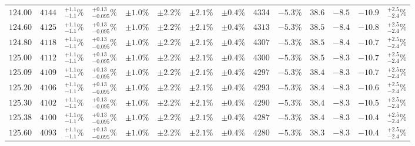\begin{landscape}
\begin{table}[ht!]
{\begin{tabular}{| cc | ccc | ccc | ccc | cc | c |}
$124.00$ & $4144$ & $^{+1.1}_{-1.1}\%$ & {\color{black!55}$^{+0.13}_{-0.095}\%$} & {\color{black!55}$\pm 1.0\%$} & $\pm 2.2\%$ & {\color{black!55}$\pm 2.1\%$} & {\color{black!55}$\pm 0.4\%$} & $4334$ & $-5.3\%$ & $38.6$ & $-8.5$ & $-10.9$ & $^{+2.5}_{-2.4}\%$ \\
$124.60$ & $4125$ & $^{+1.1}_{-1.1}\%$ & {\color{black!55}$^{+0.13}_{-0.095}\%$} & {\color{black!55}$\pm 1.0\%$} & $\pm 2.2\%$ & {\color{black!55}$\pm 2.1\%$} & {\color{black!55}$\pm 0.4\%$} & $4313$ & $-5.3\%$ & $38.5$ & $-8.4$ & $-10.8$ & $^{+2.5}_{-2.4}\%$ \\
$124.80$ & $4118$ & $^{+1.1}_{-1.1}\%$ & {\color{black!55}$^{+0.13}_{-0.095}\%$} & {\color{black!55}$\pm 1.0\%$} & $\pm 2.2\%$ & {\color{black!55}$\pm 2.1\%$} & {\color{black!55}$\pm 0.4\%$} & $4307$ & $-5.3\%$ & $38.5$ & $-8.4$ & $-10.7$ & $^{+2.5}_{-2.4}\%$ \\
$125.00$ & $4112$ & $^{+1.1}_{-1.1}\%$ & {\color{black!55}$^{+0.13}_{-0.095}\%$} & {\color{black!55}$\pm 1.0\%$} & $\pm 2.2\%$ & {\color{black!55}$\pm 2.1\%$} & {\color{black!55}$\pm 0.4\%$} & $4300$ & $-5.3\%$ & $38.5$ & $-8.3$ & $-10.7$ & $^{+2.5}_{-2.4}\%$ \\
$125.09$ & $4109$ & $^{+1.1}_{-1.1}\%$ & {\color{black!55}$^{+0.13}_{-0.095}\%$} & {\color{black!55}$\pm 1.0\%$} & $\pm 2.2\%$ & {\color{black!55}$\pm 2.1\%$} & {\color{black!55}$\pm 0.4\%$} & $4297$ & $-5.3\%$ & $38.4$ & $-8.3$ & $-10.7$ & $^{+2.5}_{-2.4}\%$ \\
$125.20$ & $4106$ & $^{+1.1}_{-1.1}\%$ & {\color{black!55}$^{+0.13}_{-0.095}\%$} & {\color{black!55}$\pm 1.0\%$} & $\pm 2.2\%$ & {\color{black!55}$\pm 2.1\%$} & {\color{black!55}$\pm 0.4\%$} & $4293$ & $-5.3\%$ & $38.4$ & $-8.3$ & $-10.6$ & $^{+2.5}_{-2.4}\%$ \\
$125.30$ & $4102$ & $^{+1.1}_{-1.1}\%$ & {\color{black!55}$^{+0.13}_{-0.095}\%$} & {\color{black!55}$\pm 1.0\%$} & $\pm 2.2\%$ & {\color{black!55}$\pm 2.1\%$} & {\color{black!55}$\pm 0.4\%$} & $4290$ & $-5.3\%$ & $38.4$ & $-8.3$ & $-10.5$ & $^{+2.5}_{-2.4}\%$ \\
$125.38$ & $4100$ & $^{+1.1}_{-1.1}\%$ & {\color{black!55}$^{+0.13}_{-0.095}\%$} & {\color{black!55}$\pm 1.0\%$} & $\pm 2.2\%$ & {\color{black!55}$\pm 2.1\%$} & {\color{black!55}$\pm 0.4\%$} & $4287$ & $-5.3\%$ & $38.4$ & $-8.3$ & $-10.4$ & $^{+2.5}_{-2.4}\%$ \\
$125.60$ & $4093$ & $^{+1.1}_{-1.1}\%$ & {\color{black!55}$^{+0.13}_{-0.095}\%$} & {\color{black!55}$\pm 1.0\%$} & $\pm 2.2\%$ & {\color{black!55}$\pm 2.1\%$} & {\color{black!55}$\pm 0.4\%$} & $4280$ & $-5.3\%$ & $38.3$ & $-8.3$ & $-10.4$ & $^{+2.5}_{-2.4}\%$ \\

\end{tabular}}
\end{table}
\end{landscape}

